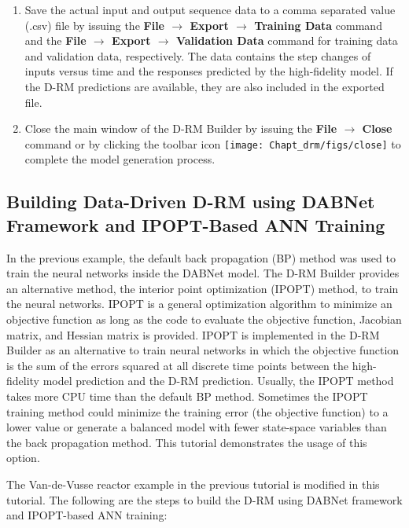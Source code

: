 \begin{enumerate}
	\item Save the actual input and output sequence data to a comma separated value (.csv) file by issuing the \textbf{File $\rightarrow$ Export $\rightarrow$ Training Data} command and the \textbf{File $\rightarrow$ Export $\rightarrow$ Validation Data} command for training data and validation data, respectively.  The data contains the step changes of inputs versus time and the responses predicted by the high-fidelity model.  If the D-RM predictions are available, they are also included in the exported file.
	\item Close the main window of the D-RM Builder by issuing the \textbf{File $\rightarrow$ Close} command or by clicking the toolbar icon \texttt{[image: Chapt\_drm/figs/close]} to complete the model generation process.
\end{enumerate}

\subsection{Building Data-Driven D-RM using DABNet Framework and IPOPT-Based ANN Training}
In the previous example, the default back propagation (BP) method was used to train the neural networks inside the DABNet model.  The D-RM Builder provides an alternative method, the interior point optimization (IPOPT) method, to train the neural networks.  IPOPT is a general optimization algorithm to minimize an objective function as long as the code to evaluate the objective function, Jacobian matrix, and Hessian matrix is provided.  IPOPT is implemented in the D-RM Builder as an alternative to train neural networks in which the objective function is the sum of the errors squared at all discrete time points between the high-fidelity model prediction and the D-RM prediction.  Usually, the IPOPT method takes more CPU time than the default BP method.  Sometimes the IPOPT training method could minimize the training error (the objective function) to a lower value or generate a balanced model with fewer state-space variables than the back propagation method.  This tutorial demonstrates the usage of this option.

The Van-de-Vusse reactor example in the previous tutorial is modified in this tutorial. The following are the steps to build the D-RM using DABNet framework and IPOPT-based ANN training:
 
